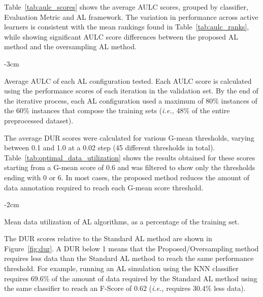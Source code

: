 \documentclass[preprint, 12pt]{elsarticle}
\begin{document}
Table~\ref{tab:aulc_scores} shows the average AULC scores, grouped by
classifier, Evaluation Metric and AL framework. The variation in performance
across active learners is consistent with the mean rankings found in
Table~\ref{tab:aulc_ranks}, while showing significant AULC score differences
between the proposed AL method and the oversampling AL method.

\begin{table}
	\centering
    \addtolength{\leftskip} {-3cm}
    \addtolength{\rightskip}{-3cm}
    \caption{\label{tab:aulc_scores}
        Average AULC of each AL configuration tested. Each AULC score is
        calculated using the performance scores of each iteration in the
        validation set. By the end of the iterative process, each AL
        configuration used a maximum of 80\% instances of the 60\% instances
        that compose the training sets (\textit{i.e.,} 48\% of the entire
        preprocessed dataset).
    }
\end{table}

The average DUR scores were calculated for various G-mean thresholds, varying
between 0.1 and 1.0 at a 0.02 step (45 different thresholds in total).
Table~\ref{tab:optimal_data_utilization} shows the results obtained for these
scores starting from a G-mean score of 0.6 and was filtered to show only the
thresholds ending with 0 or 6. In most cases, the proposed method reduces the
amount of data annotation required to reach each G-mean score threshold.

\begin{table}
    \centering
    \addtolength{\leftskip} {-2cm}
    \addtolength{\rightskip}{-2cm}
    \caption{\label{tab:optimal_data_utilization}
        Mean data utilization of AL algorithms, as a percentage of the
        training set.
    }
\end{table}

The DUR scores relative to the Standard AL method are shown in
Figure~\ref{fig:dur}. A DUR below 1 means that the Proposed/Oversampling
method requires less data than the Standard AL method to reach the same
performance threshold. For example, running an AL simulation using the KNN
classifier requires 69.6\% of the amount of data required by the Standard AL
method using the same classifier to reach an F-Score of 0.62 (\textit{i.e.,}
requires 30.4\% less data).
\end{document}
